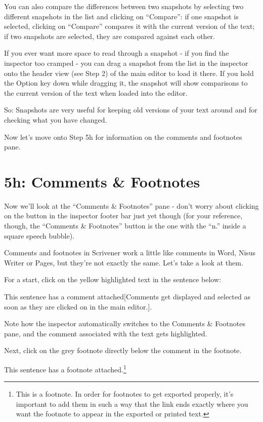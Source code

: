 \documentclass[10pt,oneside]{memoir}
\begin{document}
You can also compare the differences between two snapshots by selecting two different snapshots in the list and clicking on ``Compare'': if one snapshot is selected, clicking on ``Compare'' compares it with the current version of the text; if two snapshots are selected, they are compared against each other.


If you ever want more space to read through a snapshot - if you find the inspector too cramped - you can drag a snapshot from the list in the inspector onto the header view (see Step 2) of the main editor to load it there. If you hold the Option key down while dragging it, the snapshot will show comparisons to the current version of the text when loaded into the editor.


So: Snapshots are very useful for keeping old versions of your text around and for checking what you have changed.


Now let's move onto Step 5h for information on the comments and footnotes pane.


\pagebreak \section{5h: Comments \& Footnotes}
\label{h:commentsfootnotes}

Now we'll look at the ``Comments \& Footnotes'' pane - don't worry about clicking on the button in the inspector footer bar just yet though (for your reference, though, the ``Comments \& Footnotes'' button is the one with the ``n.'' inside a square speech bubble).


Comments and footnotes in Scrivener work a little like comments in Word, Nisus Writer or Pages, but they're not exactly the same. Let's take a look at them.


For a start, click on the yellow highlighted text in the sentence below:


This sentence has a comment attached[Comments get displayed and selected as soon as they are clicked on in the main editor.].


Note how the inspector automatically switches to the Comments \& Footnotes pane, and the comment associated with the text gets highlighted.


Next, click on the grey footnote directly below the comment in the footnote.


This sentence has a footnote attached.\footnote{This is a footnote. In order for footnotes to get exported properly, it's important to add them in such a way that the link ends exactly where you want the footnote to appear in the exported or printed text.}
\end{document}

